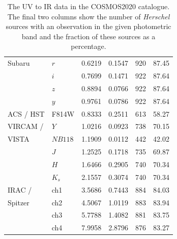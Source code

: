 \begin{table}
\begin{tabular}{p{4cm}|p{1.5cm}|p{2cm}|p{2cm}|p{1.5cm}|p{1.5cm}}
		Subaru & $r$ & 0.6219 & 0.1547 & 920 & 87.45 \\
		& $i$ & 0.7699 & 0.1471 & 922 & 87.64 \\
		& $z$ & 0.8894 & 0.0766 & 922 & 87.64 \\
		& $y$ & 0.9761 & 0.0786 & 922 & 87.64 \\
		\hline
		ACS / HST & F814W & 0.8333 & 0.2511 & 613 & 58.27 \\
		\hline
		VIRCAM / & $Y$ & 1.0216 & 0.0923 & 738 & 70.15 \\
		VISTA & $NB118$ & 1.1909 & 0.0112 & 442 & 42.02 \\
		& $J$ & 1.2525 & 0.1718 & 735 & 69.87 \\
		& $H$ & 1.6466 & 0.2905 & 740 & 70.34 \\
		& $K_s$ & 2.1557 & 0.3074 & 740 & 70.34 \\
		\hline
		IRAC / & ch1 & 3.5686 & 0.7443 & 884 & 84.03 \\
		Spitzer & ch2 & 4.5067 & 1.0119 & 883 & 83.94 \\
		& ch3 & 5.7788 & 1.4082 & 881 & 83.75 \\
		& ch4 & 7.9958 & 2.8796 & 876 & 83.27 \\
		\hline
		\hline
    \end{tabular}
    \caption[UV to IR coverage of our \textit{Herschel} galaxies from COSMOS2020]{The UV to IR data in the COSMOS2020 catalogue. The final two columns show the number of \textit{Herschel} sources with an observation in the given photometric band and the fraction of these sources as a percentage.}
    \label{tab:smg_coverage}
\end{table}

